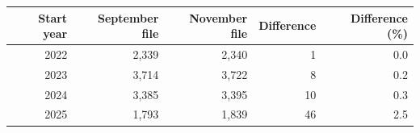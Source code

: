 \begin{tabular}{rrrrr}
\toprule
Start year & September file & November file & Difference & Difference (\%) \\
\midrule
2022 & 2{,}339 & 2{,}340 & 1 & 0.0 \\
2023 & 3{,}714 & 3{,}722 & 8 & 0.2 \\
2024 & 3{,}385 & 3{,}395 & 10 & 0.3 \\
2025 & 1{,}793 & 1{,}839 & 46 & 2.5 \\
\bottomrule
\end{tabular}

